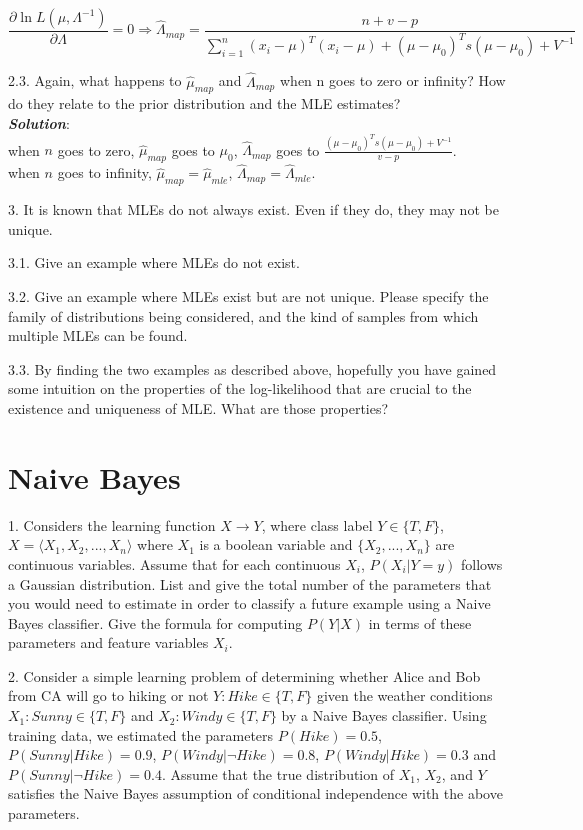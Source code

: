 \documentclass{article}
\theoremstyle{definition}
\theoremstyle{definition}
\theoremstyle{remark}
\begin{document}
\[\frac{\partial \ln L(\mu,\Lambda^{-1})}{\partial\Lambda}=0 \Rightarrow \hat{\Lambda}_{map}=\frac{n+v-p}{\sum\limits_{i=1}^{n}(x_i-\mu)^T(x_i-\mu)+ (\mu-\mu_0)^Ts(\mu-\mu_0)+V^{-1}}\]

2.3. Again, what happens to $\hat{\mu}_{map}$ and $\hat{\Lambda}_{map}$ when n goes to zero or infinity?
How do they relate to the prior distribution and the MLE
estimates?\\
\emph{\textbf{Solution}}:\\
when $n$ goes to zero, $\hat{\mu}_{map}$ goes to $\mu_0$, $\hat{\Lambda}_{map}$  goes to $\frac{(\mu-\mu_0)^Ts(\mu-\mu_0)+V^{-1}}{v-p}$.\\
when $n$ goes to infinity, $\hat{\mu}_{map}=\hat{\mu}_{mle}$, $\hat{\Lambda}_{map}=\hat{\Lambda}_{mle}$.

3. It is known that MLEs do not always exist. Even if they do, they may not be unique.

3.1. Give an example where MLEs do not exist.

3.2. Give an example where MLEs exist but are not unique. Please specify the family of distributions being considered, and the kind of samples from which multiple MLEs can be found.

3.3. By finding the two examples as described above, hopefully you have gained some intuition
on the properties of the log-likelihood that are crucial to the existence and uniqueness of MLE. What
are those properties?

\section*{Naive Bayes}

1. Considers the learning function $X \rightarrow Y$, where class label $Y\in\{T,F\}$, $X=\langle X_1,X_2,...,X_n \rangle$ where $X_1$ is a boolean variable and $\{X_2,...,X_n\}$ are continuous variables. Assume that for each continuous $X_i$, $P(X_i|Y=y)$ follows a Gaussian distribution. List and give the total number of the parameters that you would need to estimate in order to classify a future example using a Naive Bayes classifier.
Give the formula for computing $P(Y|X)$ in terms of these
parameters and feature variables $X_i$.

2. Consider a simple learning problem of determining whether Alice and Bob from CA will go to hiking or not
$Y:Hike\in\{T,F\}$ given the weather conditions $X_1:Sunny\in\{T,F\}$ and $X_2:Windy\in\{T,F\}$ by a
Naive Bayes classifier. Using training data, we estimated the parameters $P(Hike) = 0.5$, $P(Sunny|Hike) = 0.9$, $P(Windy|\neg Hike) = 0.8$, $P(Windy|Hike) = 0.3$ and $P(Sunny|\neg Hike) = 0.4$. Assume that the true distribution of $X_1$, $X_2$, and $Y$ satisfies the Naive Bayes
assumption of conditional independence with the above parameters.
\end{document}
